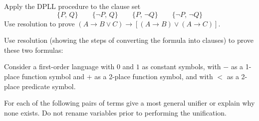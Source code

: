 \documentclass{supervision}
\begin{document}
\begin{questions}
    \question Apply the DPLL procedure to the clause set
      \begin{equation*}
        \{P,\, Q\} \quad\quad \{\lnot P,\, Q\} \quad\quad \{P,\, \lnot Q\}
        \quad \quad \{\lnot P,\, \lnot Q\}
      \end{equation*}
    \question Use resolution to prove $(A \to B \lor C) \to [(A \to B)
      \lor (A \to C)]$.

    \question Use resolution (showing the steps of converting the formula into
      clauses) to prove these two formulas:

    \question Consider a first-order language with $0$ and $1$ as constant
      symbols, with $-$ as a 1-place function symbol and $+$ as a 2-place
      function  symbol, and with $<$ as a 2-place predicate symbol.

    \question For each of the following pairs of terms give a most general
      unifier or explain why none exists. Do not rename variables prior to
      performing the unification.
\end{questions}
\end{document}
